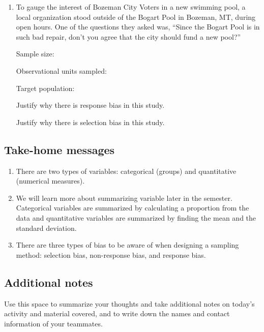 \documentclass[
]{report}
\begin{document}
\begin{enumerate}
\def\labelenumi{\arabic{enumi}.}
\setcounter{enumi}{6}
\item
  To gauge the interest of Bozeman City Voters in a new swimming pool, a local organization stood outside of the Bogart Pool in Bozeman, MT, during open hours. One of the questions they asked was, ``Since the Bogart Pool is in such bad repair, don't you agree that the city should fund a new pool?''
  \vspace{0.1in}

  Sample size:
  \vspace{0.3in}

  Observational units sampled:
  \vspace{0.3in}

  Target population:
  \vspace{0.3in}

  Justify why there is response bias in this study.
  \vspace{0.5in}

  Justify why there is selection bias in this study.
  \vspace{0.5in}
\end{enumerate}

\subsection{Take-home messages}\label{take-home-messages}

\begin{enumerate}
\def\labelenumi{\arabic{enumi}.}
\item
  There are two types of variables: categorical (groups) and quantitative (numerical measures).
\item
  We will learn more about summarizing variable later in the semester. Categorical variables are summarized by calculating a proportion from the data and quantitative variables are summarized by finding the mean and the standard deviation.
\item
  There are three types of bias to be aware of when designing a sampling method: selection bias, non-response bias, and response bias.
\end{enumerate}

\subsection{Additional notes}\label{additional-notes}

Use this space to summarize your thoughts and take additional notes on today's activity and material covered, and to write down the names and contact information of your teammates.
\end{document}
